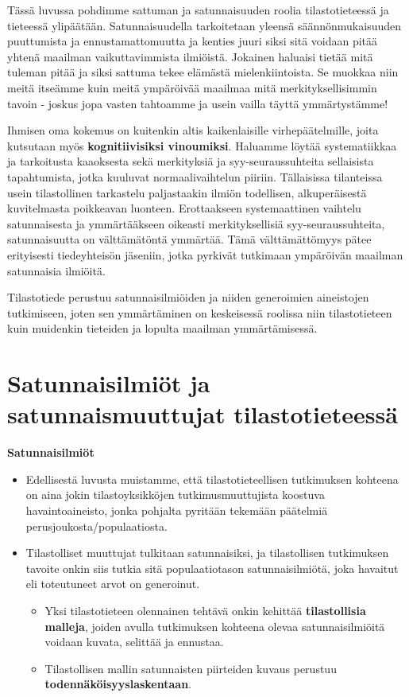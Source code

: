 \documentclass[
]{book}
\providecommand{\tightlist}{%
  \setlength{\itemsep}{0pt}\setlength{\parskip}{0pt}}
\begin{document}
Tässä luvussa pohdimme sattuman ja satunnaisuuden roolia tilastotieteessä ja tieteessä ylipäätään. Satunnaisuudella tarkoitetaan yleensä säännönmukaisuuden puuttumista ja ennustamattomuutta ja kenties juuri siksi sitä voidaan pitää yhtenä maailman vaikuttavimmista ilmiöistä. Jokainen haluaisi tietää mitä tuleman pitää ja siksi sattuma tekee elämästä mielenkiintoista. Se muokkaa niin meitä itseämme kuin meitä ympäröivää maailmaa mitä merkityksellisimmin tavoin - joskus jopa vasten tahtoamme ja usein vailla täyttä ymmärtystämme!

Ihmisen oma kokemus on kuitenkin altis kaikenlaisille virhepäätelmille, joita kutsutaan myös \textbf{kognitiivisiksi vinoumiksi}. Haluamme löytää systematiikkaa ja tarkoitusta kaaoksesta sekä merkityksiä ja syy-seuraussuhteita sellaisista tapahtumista, jotka kuuluvat normaalivaihtelun piiriin. Tällaisissa tilanteissa usein tilastollinen tarkastelu paljastaakin ilmiön todellisen, alkuperäisestä kuvitelmasta poikkeavan luonteen. Erottaakseen systemaattinen vaihtelu satunnaisesta ja ymmärtääkseen oikeasti merkityksellisiä syy-seuraussuhteita, satunnaisuutta on välttämätöntä ymmärtää. Tämä välttämättömyys pätee erityisesti tiedeyhteisön jäseniin, jotka pyrkivät tutkimaan ympäröivän maailman satunnaisia ilmiöitä.

Tilastotiede perustuu satunnaisilmiöiden ja niiden generoimien aineistojen tutkimiseen, joten sen ymmärtäminen on keskeisessä roolissa niin tilastotieteen kuin muidenkin tieteiden ja lopulta maailman ymmärtämisessä.

\hypertarget{alaluku41}{%
\section{Satunnaisilmiöt ja satunnaismuuttujat tilastotieteessä}\label{alaluku41}}

\textbf{Satunnaisilmiöt}

\begin{itemize}
\tightlist
\item
  Edellisestä luvusta muistamme, että tilastotieteellisen tutkimuksen kohteena on aina jokin tilastoyksikköjen tutkimusmuuttujista koostuva havaintoaineisto, jonka pohjalta pyritään tekemään päätelmiä perusjoukosta/populaatiosta.
\item
  Tilastolliset muuttujat tulkitaan satunnaisiksi, ja tilastollisen tutkimuksen tavoite onkin siis tutkia sitä populaatiotason satunnaisilmiötä, joka havaitut eli toteutuneet arvot on generoinut.

  \begin{itemize}
  \tightlist
  \item
    Yksi tilastotieteen olennainen tehtävä onkin kehittää \textbf{tilastollisia malleja}, joiden avulla tutkimuksen kohteena olevaa satunnaisilmiöitä voidaan kuvata, selittää ja ennustaa.
  \item
    Tilastollisen mallin satunnaisten piirteiden kuvaus perustuu \textbf{todennäköisyyslaskentaan}.
  \end{itemize}
\end{itemize}
\end{document}

